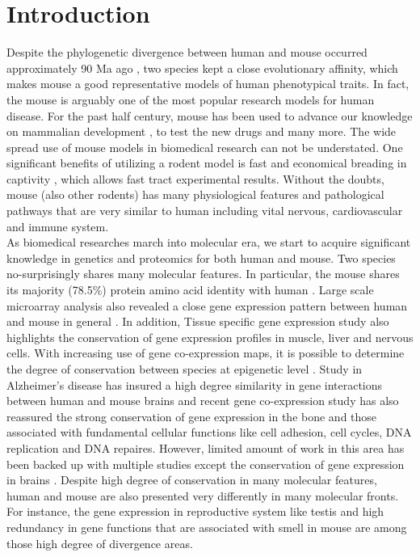 \section{Introduction}

Despite the phylogenetic divergence between human and mouse occurred approximately 90 Ma ago \cite{Hedges_2006}, two species kept a close evolutionary affinity, which makes mouse a good representative models of human phenotypical traits. In fact, the mouse is arguably one of the most popular research models for human disease. For the past half century, mouse has been used to advance our knowledge on mammalian development \cite{Ueda_2006, Cheon_2011}, to test the new drugs \cite{Van_Dam_2011} and many more. The wide spread use of mouse models in biomedical research can not be understated. \cite{MORSEIII_2007} One significant benefits of utilizing a rodent model is fast and economical breading in captivity \cite{Rosenthal_2007}, which allows fast tract experimental results. \cite{Vandamme_2014} Without the doubts, mouse (also other rodents) has many physiological features and pathological pathways that are very similar to human including vital nervous, cardiovascular and immune system. \cite{MORSEIII_2007,Rosenthal_2007} \\

As biomedical researches march into molecular era, we start to acquire significant knowledge in genetics and proteomics for both human and mouse. Two species no-surprisingly shares many molecular features. In particular, the mouse shares its majority (78.5\%) protein amino acid identity with human \cite{Lindblad_Toh_2001}. Large scale microarray analysis also revealed a close gene expression pattern between human and mouse in general \cite{Liao_2005}. In addition, Tissue specific gene expression study \cite{Zheng_Bradley_2010} also highlights the conservation of gene expression profiles in muscle, liver and nervous cells. With increasing use of gene co-expression maps, it is possible to determine the degree of conservation between species at epigenetic level \cite{Stuart_2003,Oldham_2006}. Study in Alzheimer's disease \cite{Miller_2010} has insured a high degree similarity in gene interactions between human and mouse brains and recent gene co-expression study \cite{Monaco_2015} has also reassured the strong conservation of gene expression in the bone and those associated with fundamental cellular functions like cell adhesion, cell cycles, DNA replication and DNA repaires. \cite{Monaco_2015} However, limited amount of work in this area has been backed up with multiple studies except the conservation of gene expression in brains \cite{Liao_2005, Voolstra_2006, Miller_2010, Chan_2009}. Despite high degree of conservation in many molecular features, human and mouse are also presented very differently in many molecular fronts. For instance, the gene expression in reproductive system like testis \cite{Chan_2009, Brawand_2011, Necsulea_2014} and high redundancy in gene functions that are associated with smell in mouse \cite{Gilad_2009, Gilad_2003, Young_2002} are among those high degree of divergence areas. 
\\

